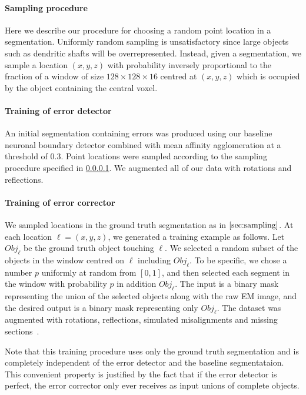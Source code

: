 \documentclass{article}
\begin{document}
\paragraph{Sampling procedure}
\label{sec:sampling}
Here we describe our procedure for choosing a random point location in a segmentation. Uniformly random sampling is unsatisfactory since large objects such as dendritic shafts will be overrepresented. Instead, given a segmentation, we sample a location $(x,y,z)$ with probability inversely proportional to the fraction of a window of size $128 \times 128 \times 16$ centred at $(x,y,z)$ which is occupied by the object containing the central voxel.

\paragraph{Training of error detector}
An initial segmentation containing errors was produced using our baseline neuronal boundary detector combined with mean affinity agglomeration at a threshold of 0.3. Point locations were sampled according to the sampling procedure specified in \ref{sec:sampling}. We augmented all of our data with rotations and reflections.

\paragraph{Training of error corrector}
We sampled locations in the ground truth segmentation as in $\ref{sec:sampling}$. At each location $\ell = (x,y,z)$, we generated a training example as follows. Let $Obj_\ell$ be the ground truth object touching $\ell$. We selected a random subset of the objects in the window centred on $\ell$ including $Obj_\ell$. To be specific, we chose a number $p$ uniformly at random from $[0,1]$, and then selected each segment in the window with probability $p$ in addition $Obj_\ell$. The input is a binary mask representing the union of the selected objects along with the raw EM image, and the desired output is a binary mask representing only $Obj_\ell$. The dataset was augmented with rotations, reflections, simulated misalignments and missing sections~\cite{kisuk}.

Note that this training procedure uses only the ground truth segmentation and is completely independent of the error detector and the baseline segmentataion. This convenient property is justified by the fact that if the error detector is perfect, the error corrector only ever receives as input unions of complete objects.
\end{document}
